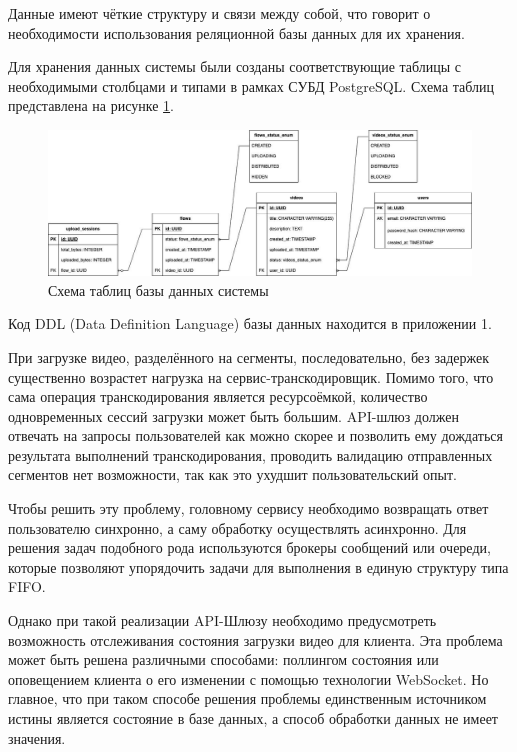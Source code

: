 	Данные имеют чёткие структуру и связи между собой, что говорит о необходимости использования реляционной базы данных для их хранения.

	Для хранения данных системы были созданы соответствующие таблицы с необходимыми столбцами и типами в рамках СУБД PostgreSQL. Схема таблиц представлена на рисунке \ref{fig:db_scheme}.
	\begin{figure}[ht!] 
		\center
		\includegraphics [scale=0.37] {my_folder/images//db_scheme}
		\caption{Схема таблиц базы данных системы} 
		\label{fig:db_scheme}  
	\end{figure}

	Код DDL (Data Definition Language) базы данных находится в приложении 1.

	При загрузке видео, разделённого на сегменты, последовательно, без задержек существенно возрастет нагрузка на сервис-транскодировщик. Помимо того, что сама операция транскодирования является ресурсоёмкой, количество одновременных сессий загрузки может быть большим. API-шлюз должен отвечать на запросы пользователей как можно скорее и позволить ему дождаться результата выполнений транскодирования, проводить валидацию отправленных сегментов нет возможности, так как это ухудшит пользовательский опыт.

	Чтобы решить эту проблему, головному сервису необходимо возвращать ответ пользователю синхронно, а саму обработку осуществлять асинхронно. Для решения задач подобного рода используются брокеры сообщений или очереди, которые позволяют упорядочить задачи для выполнения в единую структуру типа FIFO.

	Однако при такой реализации API-Шлюзу необходимо предусмотреть возможность отслеживания состояния загрузки видео для клиента. Эта проблема может быть решена различными способами: поллингом состояния или оповещением клиента о его изменении с помощью технологии WebSocket. Но главное, что при таком способе решения проблемы единственным источником истины является состояние в базе данных, а способ обработки данных не имеет значения.

